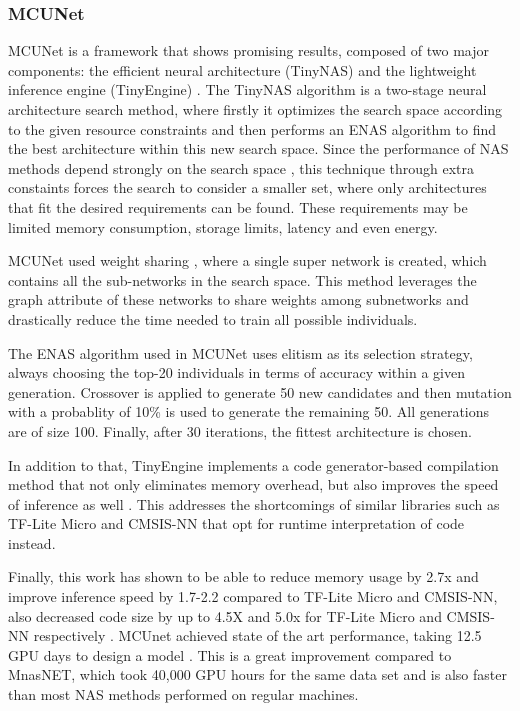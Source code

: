 \documentclass[10pt,        %
               a4paper,     %
               journal,     %
               ]{IEEEtran}
\begin{document}
\subsubsection{\textbf{MCUNet}}
MCUNet is a framework that shows promising results, composed of
two major components: the efficient neural architecture (TinyNAS) and the lightweight inference engine (TinyEngine) \cite{lin2020mcunet}.
The TinyNAS algorithm is a two-stage neural architecture search method, where firstly it optimizes the search space according to the
given resource constraints and then performs an ENAS algorithm to find the best architecture within this new search space.
Since the performance of NAS methods depend strongly on the search space \cite{radosavovic2020designing}, this technique
through extra constaints forces the search to consider a smaller set, where only architectures that fit the desired requirements
can be found. These requirements may be limited memory consumption, storage limits, latency and even energy.

MCUNet used weight sharing \cite{lin2020mcunet}, where a single super network is created, which contains all the
sub-networks in the search space. This method leverages the graph attribute of these networks to share weights among
subnetworks and drastically reduce the time needed to train all possible individuals.

The ENAS algorithm used in MCUNet uses elitism as its selection strategy, always choosing the top-20 individuals in
terms of accuracy within a given generation. Crossover is applied to generate 50 new candidates and then mutation with a
probablity of 10\% is used to generate the remaining 50. All generations are of size 100. Finally, after 30 iterations,
the fittest architecture is chosen.

In addition to that, TinyEngine implements a code generator-based compilation method that not only eliminates memory overhead, but also improves
the speed of inference as well \cite{lin2020mcunet}. This addresses the shortcomings of similar libraries such as TF-Lite
Micro \cite{abadi2016tensorflow} and CMSIS-NN \cite{lai1801efficient} that opt for runtime interpretation of code instead.

Finally, this work has shown to be able to reduce memory usage by 2.7x and improve inference speed by 1.7-2.2
compared to TF-Lite Micro and CMSIS-NN, also decreased code size by up to 4.5X and 5.0x for TF-Lite Micro and CMSIS-NN
respectively \cite{lin2020mcunet}. MCUnet achieved state of the art performance, taking 12.5 GPU days to design a model
\cite{lin2020mcunet}. This is a great improvement compared to MnasNET, which took 40,000 GPU hours for the same
data set \cite{tan2019mnasnet} and is also faster than most NAS methods performed on regular machines.
\end{document}
